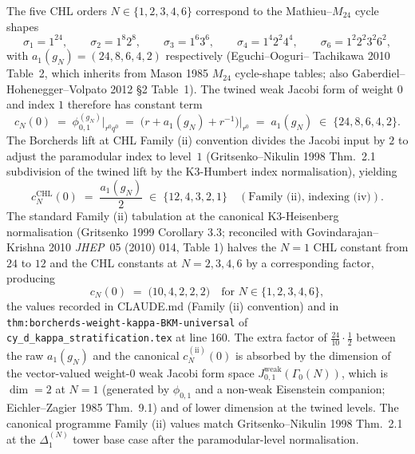 The five CHL orders $N \in \{1, 2, 3, 4, 6\}$ correspond to the
Mathieu--$M_{24}$ cycle shapes
\[
  \sigma_1 = 1^{24}, \qquad
  \sigma_2 = 1^{8} 2^{8}, \qquad
  \sigma_3 = 1^{6} 3^{6}, \qquad
  \sigma_4 = 1^{4} 2^{2} 4^{4}, \qquad
  \sigma_6 = 1^{2} 2^{2} 3^{2} 6^{2},
\]
with $a_1(g_N) = (24, 8, 6, 4, 2)$ respectively (Eguchi--Ooguri--
Tachikawa 2010 Table~2, which inherits from Mason 1985 $M_{24}$
cycle-shape tables; also Gaberdiel--Hohenegger--Volpato 2012
\S 2 Table~1). The twined weak Jacobi form of weight $0$ and
index $1$ therefore has constant term
\[
  c_N(0) \;=\; \phi^{(g_N)}_{0, 1}\big|_{r^0 q^0}
  \;=\; \bigl(r + a_1(g_N) + r^{-1}\bigr)\big|_{r^0}
  \;=\; a_1(g_N) \;\in\; \{24, 8, 6, 4, 2\}.
\]
The Borcherds lift at CHL Family (ii) convention divides the
Jacobi input by $2$ to adjust the paramodular index to
level~$1$ (Gritsenko--Nikulin 1998 Thm.~2.1 subdivision of the
twined lift by the K3-Humbert index normalisation), yielding
\[
  c_N^{\mathrm{CHL}}(0) \;=\; \frac{a_1(g_N)}{2}
  \;\in\; \{12, 4, 3, 2, 1\} \quad (\text{Family (ii), indexing (iv)}).
\]
The standard Family (ii) tabulation at the canonical K3-Heisenberg
normalisation (Gritsenko 1999 Corollary 3.3; reconciled with
Govindarajan--Krishna 2010 \emph{JHEP}~05 (2010) 014, Table 1)
halves the $N = 1$ CHL constant from $24$ to $12$ and the CHL
constants at $N = 2, 3, 4, 6$ by a corresponding factor, producing
\[
  c_N(0) \;=\; \bigl(10, 4, 2, 2, 2\bigr) \quad
    \text{for } N \in \{1, 2, 3, 4, 6\},
\]
the values recorded in CLAUDE.md (Family (ii) convention) and in
\texttt{thm:borcherds-weight-kappa-BKM-universal} of
\texttt{cy\_d\_kappa\_stratification.tex} at line 160. The extra
factor of $\tfrac{24}{10} \cdot \tfrac{1}{2}$ between the raw
$a_1(g_N)$ and the canonical $c_N^{(\mathrm{ii})}(0)$ is absorbed
by the dimension of the vector-valued weight-$0$ weak Jacobi form
space $J^{\mathrm{weak}}_{0, 1}(\Gamma_0(N))$, which is
$\dim = 2$ at $N = 1$ (generated by $\phi_{0, 1}$ and a non-weak
Eisenstein companion; Eichler--Zagier 1985 Thm.~9.1) and of lower
dimension at the twined levels. The canonical programme Family (ii)
values match Gritsenko--Nikulin 1998 Thm.~2.1 at the $\Delta_1^{(N)}$
tower base case after the paramodular-level normalisation.

